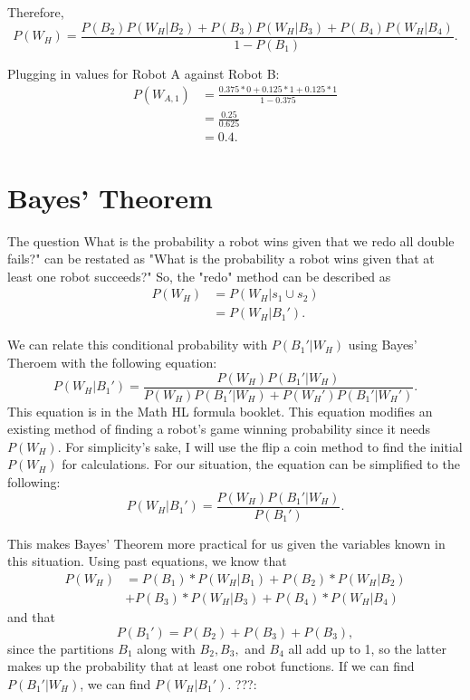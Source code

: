 \documentclass[11pt]{article}
\begin{document}
Therefore,
\begin{equation*}
    P(W_{H}) = \frac{P(B_2)P(W_H | B_2) + P(B_3)P(W_H | B_3) + P(B_4)P(W_H | B_4)}{1-P(B_1)}.
\end{equation*}

Plugging in values for Robot A against Robot B:
\begin{align*}
    P(W_{A,1}) &= \frac{0.375 * 0 + 0.125 * 1 + 0.125 * 1}{1-0.375}\\
    &=\frac{0.25}{0.625}\\
    &=0.4.
\end{align*}


\section{Bayes' Theorem}
The question What is the probability a robot wins given that we redo all double fails?" can be restated as
"What is the probability a robot wins given that at least one robot succeeds?" So, the "redo" method can be
described as 
\begin{align*}
    P(W_H) &= P(W_H | s_1 \cup s_2)\\
    &= P(W_H | B_1').
\end{align*}

We can relate this conditional probability with \(P(B_1' | W_H) \) using Bayes' Theroem with the following
equation:
\begin{equation*}
    P(W_H | B_1') = \frac{P(W_H) P(B_1' | W_H)}{P(W_H) P(B_1' | W_H) + P(W_H') P(B_1' | W_H')}.
\end{equation*}
This equation is in the Math HL formula booklet. This equation modifies an existing method of finding
a robot's game winning probability since it needs \(P(W_H)\). For simplicity's sake, I will use the flip
a coin method to find the initial \(P(W_H)\) for calculations. For our situation, the equation can be 
simplified to the following:
\begin{equation*}
    P(W_H | B_1') = \frac{P(W_H) P(B_1' | W_H)}{P(B_1')}.
\end{equation*}

This makes  Bayes' Theorem more practical for us given the variables known in this situation. Using past 
equations, we know that
\begin{align*}
    P(W_H) &=  P(B_{1}) * P(W_{H} | B_{1}) + P(B_{2}) * P(W_{H} | B_{2}) \\
    &+ P(B_{3}) * P(W_{H} | B_{3}) + P(B_{4}) * P(W_{H} | B_{4})
\end{align*}
and that
\begin{equation*}
    P(B_1') = P(B_2) + P(B_3) + P(B_3),
\end{equation*}
since the partitions \(B_1\) along with \(B_2, B_3,\) and \(B_4\) all add up to 1, so the latter makes up the probability that at least
one robot functions. If we can find \(P(B_1' | W_H)\), we can find \(P(W_H | B_1')\). ???:
\end{document}
